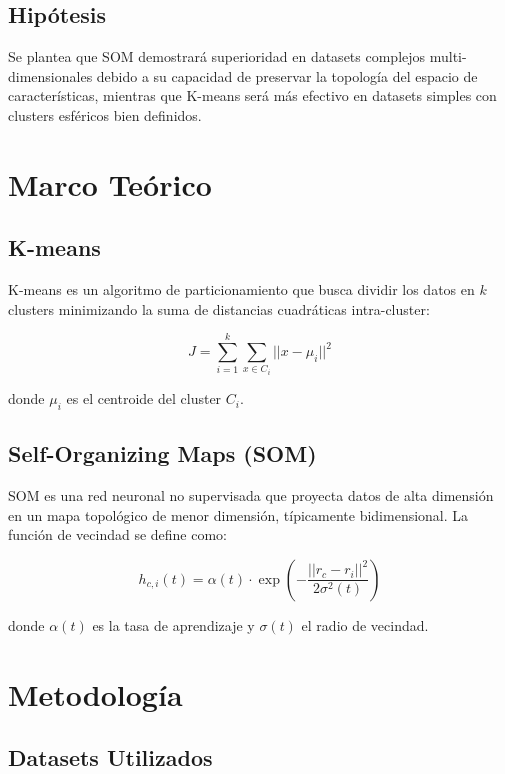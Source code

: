 \documentclass[12pt,a4paper]{article}
\begin{document}
\subsection{Hipótesis}
Se plantea que SOM demostrará superioridad en datasets complejos multi-dimensionales debido a su capacidad de preservar la topología del espacio de características, mientras que K-means será más efectivo en datasets simples con clusters esféricos bien definidos.

\section{Marco Teórico}

\subsection{K-means}
K-means es un algoritmo de particionamiento que busca dividir los datos en $k$ clusters minimizando la suma de distancias cuadráticas intra-cluster:

\begin{equation}
J = \sum_{i=1}^{k} \sum_{x \in C_i} ||x - \mu_i||^2
\end{equation}

donde $\mu_i$ es el centroide del cluster $C_i$.

\subsection{Self-Organizing Maps (SOM)}
SOM es una red neuronal no supervisada que proyecta datos de alta dimensión en un mapa topológico de menor dimensión, típicamente bidimensional. La función de vecindad se define como:

\begin{equation}
h_{c,i}(t) = \alpha(t) \cdot \exp\left(-\frac{||r_c - r_i||^2}{2\sigma^2(t)}\right)
\end{equation}

donde $\alpha(t)$ es la tasa de aprendizaje y $\sigma(t)$ el radio de vecindad.

\section{Metodología}

\subsection{Datasets Utilizados}
\end{document}
